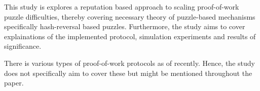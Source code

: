This study is explores a reputation based approach to scaling proof-of-work puzzle difficulties, thereby covering necessary theory of puzzle-based mechanisms specifically hash-reversal based puzzles. Furthermore, the study aims to cover explainations of the implemented protocol, simulation experiments and results of significance. 

There is various types of proof-of-work protocols as of recently. Hence, the study does not specifically aim to cover these but might be mentioned throughout the paper.  

\begin{comment}
Scope: \\
The coverage of this study ..... \\
The study consists of ..... \\
The study covers the ..... \\
This study is focus on ..... \\

Delimitations: \\
The study does not cover the ..... \\
The researcher limited this research to ..... \\
This study is limited to ..... \\
\end{comment}